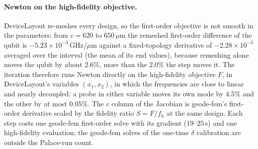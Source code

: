 \documentclass{anvil-paper}
\begin{document}
\paragraph{Newton on the high-fidelity objective.}
DeviceLayout re-meshes every design, so the first-order objective is not
smooth in the parameters: from $c = 620$ to $650\,\mu$m the remeshed
first-order difference of the qubit is $-5.23\times10^{-3}$\,GHz/$\mu$m
against a fixed-topology derivative of $-2.28\times10^{-3}$ averaged over
the interval (the mean of its end values), because remeshing alone moves
the qubit by about $2.6\%$, more than the $2.0\%$ the step moves it. The
iteration therefore runs Newton directly on the high-fidelity objective
$F$, in DeviceLayout's variables $(x_1, x_2)$, in which the frequencies are
close to linear and nearly decoupled: a probe in either variable moves its
own mode by $4.5\%$ and the other by at most $0.05\%$. The $c$ column of
the Jacobian is geode-fem's first-order derivative scaled by the fidelity
ratio $S = F/f_h$ at the same design. Each step costs one geode-fem
first-order solve with its gradient ($19$--$25$\,s) and one high-fidelity
evaluation; the geode-fem solves of the one-time $\delta$ calibration are
outside the Palace-run count.
\end{document}
